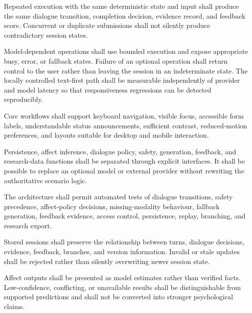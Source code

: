 \begin{description}[leftmargin=!,labelwidth=3.7cm,style=nextline]
    \item[\textbf{NFR8. Reliability and consistency}]
    Repeated execution with the same deterministic state and input shall produce the same dialogue transition, completion decision, evidence record, and feedback score. Concurrent or duplicate submissions shall not silently produce contradictory session states.

    \item[\textbf{NFR9. Responsiveness and failure recovery}]
    Model-dependent operations shall use bounded execution and expose appropriate busy, error, or fallback states. Failure of an optional operation shall return control to the user rather than leaving the session in an indeterminate state. The locally controlled text-first path shall be measurable independently of provider and model latency so that responsiveness regressions can be detected reproducibly.

    \item[\textbf{NFR10. Accessibility}]
    Core workflows shall support keyboard navigation, visible focus, accessible form labels, understandable status announcements, sufficient contrast, reduced-motion preferences, and layouts suitable for desktop and mobile interaction.

    \item[\textbf{NFR11. Maintainability and modularity}]
    Persistence, affect inference, dialogue policy, safety, generation, feedback, and research-data functions shall be separated through explicit interfaces. It shall be possible to replace an optional model or external provider without rewriting the authoritative scenario logic.

    \item[\textbf{NFR12. Testability}]
    The architecture shall permit automated tests of dialogue transitions, safety precedence, affect-policy decisions, missing-modality behaviour, fallback generation, feedback evidence, access control, persistence, replay, branching, and research export.

    \item[\textbf{NFR13. Data integrity}]
    Stored sessions shall preserve the relationship between turns, dialogue decisions, evidence, feedback, branches, and version information. Invalid or stale updates shall be rejected rather than silently overwriting newer session state.

    \item[\textbf{NFR14. Appropriate presentation of uncertainty}]
    Affect outputs shall be presented as model estimates rather than verified facts. Low-confidence, conflicting, or unavailable results shall be distinguishable from supported predictions and shall not be converted into stronger psychological claims.
\end{description}

